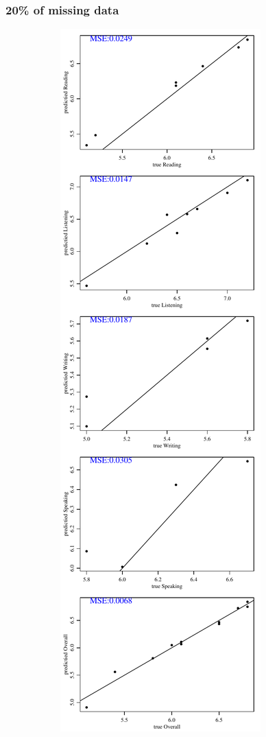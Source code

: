 \documentclass[12pt]{article}
\begin{document}
\subsubsection{20\% of missing data}
\begin{figure}[h!]
\centering
\begin{subfigure}{0.4\textwidth}
    \includegraphics[height=.85\textheight]{pic/0.20/EM_PredvsTrue.pdf}

\end{subfigure}
\end{figure}
\end{document}
